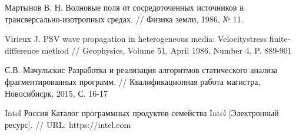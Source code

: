 \begin{thebibliography}{00}
    Мартынов В. Н.
    Волновые поля от сосредоточенных источников в трансверсально-изотропных средах. //
    Физика земли, 1986, № 11.

	Virieux J.
	P­SV wave propagation in heterogeneous media: Velocity­stress finite­difference method //
	Geophysics, Volume 51, April 1986, Number 4, P. 889­-901

	С.В. Мачульскис
	Разработка и реализация алгоритмов статического анализа фрагментированных программ. //
	Квалификационная работа магистра, Новосибисрк, 2015, С. 16-17

	Intel Россия
    Каталог программных продуктов семейства Intel [Электронный ресурс]. //
    URL: https://intel.com

\end{thebibliography}
\endgroup

\clearpage